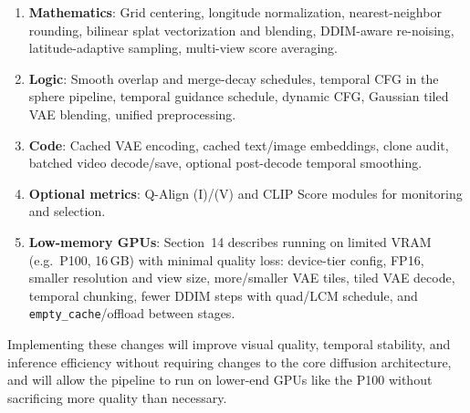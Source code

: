 \documentclass[11pt,a4paper]{article}
\newcommand{\fn}[1]{\texttt{#1}}
\begin{document}
\begin{enumerate}
    \item \textbf{Mathematics}: Grid centering, longitude normalization, nearest-neighbor rounding, bilinear splat vectorization and blending, DDIM-aware re-noising, latitude-adaptive sampling, multi-view score averaging.
    \item \textbf{Logic}: Smooth overlap and merge-decay schedules, temporal CFG in the sphere pipeline, temporal guidance schedule, dynamic CFG, Gaussian tiled VAE blending, unified preprocessing.
    \item \textbf{Code}: Cached VAE encoding, cached text/image embeddings, clone audit, batched video decode/save, optional post-decode temporal smoothing.
    \item \textbf{Optional metrics}: Q-Align (I)/(V) and CLIP Score modules for monitoring and selection.
    \item \textbf{Low-memory GPUs}: Section~14 describes running on limited VRAM (e.g.\ P100, 16\,GB) with minimal quality loss: device-tier config, FP16, smaller resolution and view size, more/smaller VAE tiles, tiled VAE decode, temporal chunking, fewer DDIM steps with quad/LCM schedule, and \fn{empty\_cache}/offload between stages.
\end{enumerate}

Implementing these changes will improve visual quality, temporal stability, and inference efficiency without requiring changes to the core diffusion architecture, and will allow the pipeline to run on lower-end GPUs like the P100 without sacrificing more quality than necessary.
\end{document}
